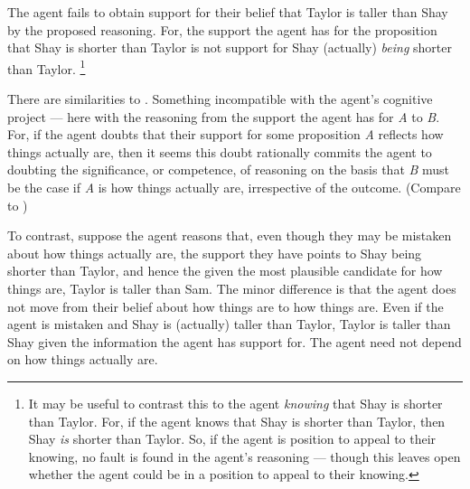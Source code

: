 \documentclass[10pt]{article}
\begin{document}
\begin{note}
  {
    \color{red}
    The agent fails to obtain support for their belief that Taylor is taller than Shay by the proposed reasoning.
    For, the support the agent has for the proposition that Shay is shorter than Taylor is not support for Shay (actually) \emph{being} shorter than Taylor.\nolinebreak
    \footnote{
      It may be useful to contrast this to the agent \emph{knowing} that Shay is shorter than Taylor.
      For, if the agent knows that Shay is shorter than Taylor, then Shay \emph{is} shorter than Taylor.
      So, if the agent is position to appeal to their knowing, no fault is found in the agent's reasoning --- though this leaves open whether the agent could be in a position to appeal to their knowing.
    }
  }

  There are similarities to \citeauthor{Wright:2011wn}.
  Something incompatible with the agent's cognitive project --- here with the reasoning from the support the agent has for \emph{A} to \emph{B}.
  For, if the agent doubts that their support for some proposition \emph{A} reflects how things actually are, then it seems this doubt rationally commits the agent to doubting the significance, or competence, of reasoning on the basis that \emph{B} must be the case if \emph{A} is how things actually are, irrespective of the outcome.
  (Compare to \cite[92]{Wright:2011wn})

\end{note}

\begin{note}
  To contrast, suppose the agent reasons that, even though they may be mistaken about how things actually are, the support they have points to Shay being shorter than Taylor, and hence the given the most plausible candidate for how things are, Taylor is taller than Sam.
  The minor difference is that the agent does not move from their belief about how things are to how things are.
  Even if the agent is mistaken and Shay is (actually) taller than Taylor, Taylor is taller than Shay given the information the agent has support for.
  The agent need not depend on how things actually are.
\end{note}
\end{document}
